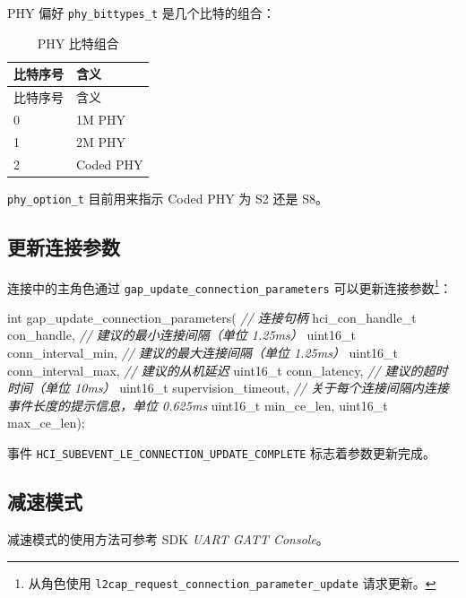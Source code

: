 \documentclass[
  12pt,
]{book}
\newenvironment{Shaded}{\begin{snugshade}}{\end{snugshade}}
\newcommand{\CommentTok}[1]{\textcolor[rgb]{0.56,0.35,0.01}{\textit{#1}}}
\newcommand{\DataTypeTok}[1]{\textcolor[rgb]{0.13,0.29,0.53}{#1}}
\newcommand{\NormalTok}[1]{#1}
\begin{document}
PHY 偏好 \texttt{phy\_bittypes\_t} 是几个比特的组合：

\begin{longtable}[]{@{}ll@{}}
\caption{\label{tab:ch2-phy-bit-types} PHY 比特组合}\tabularnewline
\toprule
比特序号 & 含义\tabularnewline
\midrule
\endfirsthead
\toprule
比特序号 & 含义\tabularnewline
\midrule
\endhead
0 & 1M PHY\tabularnewline
1 & 2M PHY\tabularnewline
2 & Coded PHY\tabularnewline
\bottomrule
\end{longtable}

\texttt{phy\_option\_t} 目前用来指示 Coded PHY 为 S2 还是 S8。

\hypertarget{ux66f4ux65b0ux8fdeux63a5ux53c2ux6570}{%
\subsection{更新连接参数}\label{ux66f4ux65b0ux8fdeux63a5ux53c2ux6570}}

连接中的主角色通过 \texttt{gap\_update\_connection\_parameters} 可以更新连接参数\footnote{从角色使用 \texttt{l2cap\_request\_connection\_parameter\_update} 请求更新。}：

\begin{Shaded}
\begin{Highlighting}[]
\DataTypeTok{int}\NormalTok{ gap_update_connection_parameters(}
  \CommentTok{// 连接句柄}
\NormalTok{  hci_con_handle_t con_handle,}
  \CommentTok{// 建议的最小连接间隔（单位 1.25ms）}
  \DataTypeTok{uint16_t}\NormalTok{ conn_interval_min,}
  \CommentTok{// 建议的最大连接间隔（单位 1.25ms）}
  \DataTypeTok{uint16_t}\NormalTok{ conn_interval_max,}
  \CommentTok{// 建议的从机延迟}
  \DataTypeTok{uint16_t}\NormalTok{ conn_latency,}
  \CommentTok{// 建议的超时时间（单位 10ms）}
  \DataTypeTok{uint16_t}\NormalTok{ supervision_timeout,}
  \CommentTok{// 关于每个连接间隔内连接事件长度的提示信息，单位 0.625ms}
  \DataTypeTok{uint16_t}\NormalTok{ min_ce_len,}
  \DataTypeTok{uint16_t}\NormalTok{ max_ce_len);}
\end{Highlighting}
\end{Shaded}

事件 \texttt{HCI\_SUBEVENT\_LE\_CONNECTION\_UPDATE\_COMPLETE} 标志着参数更新完成。

\hypertarget{ux51cfux901fux6a21ux5f0f}{%
\subsection{减速模式}\label{ux51cfux901fux6a21ux5f0f}}

减速模式的使用方法可参考 SDK \emph{UART GATT Console}。
\end{document}
